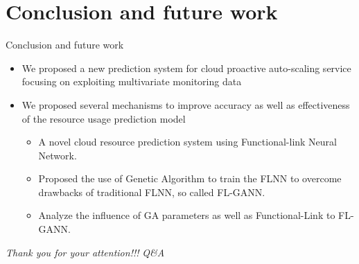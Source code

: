 \documentclass{beamer}
\begin{document}
\section{Conclusion and future work}
\begin{frame}{Conclusion and future work}
	\begin{itemize}
		\item {
		We proposed a new prediction system for cloud proactive auto-scaling service focusing on exploiting multivariate monitoring data
		}
		\item{
			We proposed several mechanisms to improve accuracy as well as effectiveness of the resource usage prediction model
			\begin{itemize}
			\item {
				A novel cloud resource prediction system using Functional-link Neural Network.
			}
			\item {
				Proposed the use of Genetic Algorithm to train the FLNN to overcome drawbacks of traditional FLNN, so called FL-GANN.
			}
			\item{
				Analyze the influence of GA parameters as well as Functional-Link to FL-GANN.
			}
		\end{itemize}
		}
	\end{itemize}
\end{frame}

\begin{frame}{}
	
		\centering \Huge
		\emph{Thank you for your attention!!!}
		\emph{Q\&A}
			
		
\end{frame}
%
%
\end{document}
